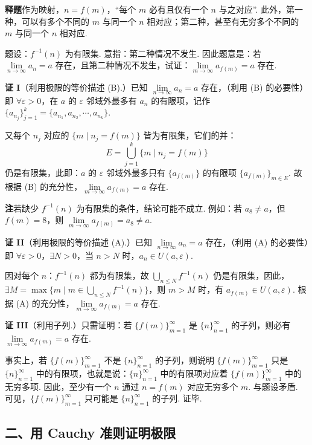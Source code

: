 \documentclass[UTF8, 12pt, fontset=fandol, oneside]{ctexart}
\begin{document}
\noindent\textbf{释题}\quad 作为映射，$n=f(m)$，“每个 $m$ 必有且仅有一个 $n$ 与之对应”. 此外，第一种，可以有多个不同的 $m$ 与同一个 $n$ 相对应；第二种，甚至有无穷多个不同的 $m$ 与同一个 $n$ 相对应.

题设：$f^{-1}(n)$ 为有限集. 意指：第二种情况不发生. 因此题意是：若 $\lim\limits_{n\to\infty}a_n=a$ 存在，且第二种情况不发生，试证：$\lim\limits_{m\to\infty}a_{f(m)}=a$ 存在.

\noindent\textbf{证 I}\quad （利用极限的等价描述 (B).）已知 $\lim\limits_{n\to\infty}a_n=a$ 存在，（利用 (B) 的必要性）即 $\forall\varepsilon>0$，在 $a$ 的 $\varepsilon$ 邻域外最多有 $a_n$ 的有限项，记作 $\{a_{n_j}\}_{j=1}^k=\{a_{n_1},a_{n_2},\cdots,a_{n_k}\}$.

又每个 $n_j$ 对应的 $\{m\mid n_j=f(m)\}$ 皆为有限集，它们的并：
\[
E=\bigcup_{j=1}^k\{m\mid n_j=f(m)\}
\]
仍是有限集，此即：$a$ 的 $\varepsilon$ 邻域外最多只有 $\{a_{f(m)}\}$ 的有限项 $\{a_{f(m)}\}_{m\in E}$. 故根据 (B) 的充分性，$\lim\limits_{m\to\infty}a_{f(m)}=a$ 存在.

\noindent\textbf{注}\quad 若缺少 $f^{-1}(n)$ 为有限集的条件，结论可能不成立. 例如：若 $a_8\ne a$，但 $f(m)=8$，则 $\lim\limits_{m\to\infty}a_{f(m)}=a_8\ne a$.

\noindent\textbf{证 II}\quad （利用极限的等价描述 (A).）已知 $\lim\limits_{n\to\infty}a_n=a$ 存在，（利用 (A) 的必要性）即 $\forall\varepsilon>0$，$\exists N>0$，当 $n>N$ 时，$a_n\in U(a,\varepsilon)$.

因对每个 $n$：$f^{-1}(n)$ 都为有限集，故 $\bigcup\limits_{n\le N}f^{-1}(n)$ 仍是有限集，因此，$\exists M=\max\{m\mid m\in \bigcup\limits_{n\le N}f^{-1}(n)\}$，则 $m>M$ 时，有 $a_{f(m)}\in U(a,\varepsilon)$. 根据 (A) 的充分性，$\lim\limits_{m\to\infty}a_{f(m)}=a$ 存在.

\noindent\textbf{证 III}\quad （利用子列.）只需证明：若 $\{f(m)\}_{m=1}^\infty$ 是 $\{n\}_{n=1}^\infty$ 的子列，则必有 $\lim\limits_{m\to\infty}a_{f(m)}=a$ 存在.

事实上，若 $\{f(m)\}_{m=1}^\infty$ 不是 $\{n\}_{n=1}^\infty$ 的子列，则说明 $\{f(m)\}_{m=1}^\infty$ 只是 $\{n\}_{n=1}^\infty$ 中的有限项，也就是说：$\{n\}_{n=1}^\infty$ 中的有限项对应着 $\{f(m)\}_{m=1}^\infty$ 中的无穷多项. 因此，至少有一个 $n$ 通过 $n=f(m)$ 对应无穷多个 $m$. 与题设矛盾. 可见，$\{f(m)\}_{m=1}^\infty$ 只可能是 $\{n\}_{n=1}^\infty$ 的子列. 证毕.

\subsection*{二、用 Cauchy 准则证明极限}
\end{document}

